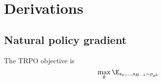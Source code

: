 \documentclass[\main/main]{subfiles}
\begin{document}
\chapter{Derivations}

\section{Natural policy gradient}

The TRPO objective is
\[
    \max_\theta \E_{s_0, \dots, s_{H-1} \sim \rho_{\theta^k}}
\]
\end{document}
